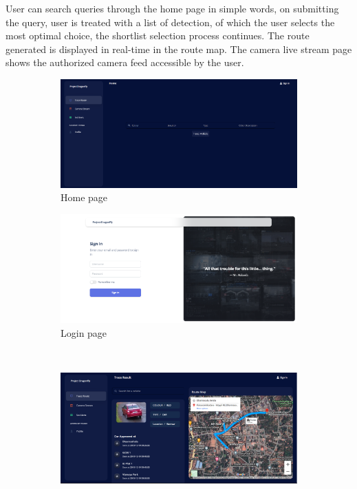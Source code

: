 User can search queries through the home page in simple words, on submitting the query, user is treated with a list of detection, of which the user selects the most optimal choice, the shortlist selection process continues. The route generated is displayed in real-time in the route map. The camera live stream page shows the authorized camera feed accessible by the user.
\begin{figure}[!ht]
	\centering
	\begin{subfigure}[b]{0.48\linewidth}
		\centering
		\includegraphics[width=\linewidth]{Images/UI/home}
		\caption{Home page}
		\label{fig:home}
	\end{subfigure} \hfill
	\begin{subfigure}[b]{0.48\linewidth}
		\centering
		\includegraphics[width=\linewidth]{Images/UI/login}
		\caption{Login page}
		\label{fig:login}
	\end{subfigure} \\ \vspace{3mm}
	\begin{subfigure}[b]{0.48\linewidth}
		\centering
		\includegraphics[width=\linewidth]{Images/UI/result}

\end{subfigure}
\end{figure}
